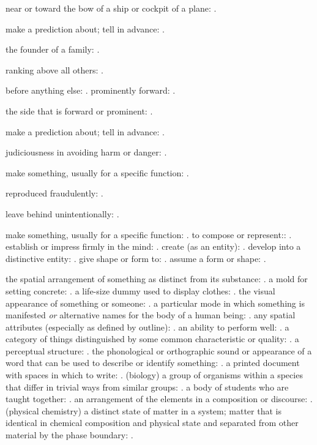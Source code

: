   near or toward the bow of a ship or cockpit of a plane: .

  make a prediction about; tell in advance: .

  the founder of a family: .

  ranking above all others: .

  before anything else: . prominently forward: .

  the side that is forward or prominent: .

  make a prediction about; tell in advance: .

  judiciousness in avoiding harm or danger: .

  make something, usually for a specific function: .

  reproduced fraudulently: .

  leave behind unintentionally: .

  make something, usually for a specific function: . to compose or represent:: . establish or impress firmly in the mind: . create (as an entity): . develop into a distinctive entity: . give shape or form to: . assume a form or shape: .

  the spatial arrangement of something as distinct from its substance: . a mold for setting concrete: . a life-size dummy used to display clothes: . the visual appearance of something or someone: . a particular mode in which something is manifested \textit{or} alternative names for the body of a human being: . any spatial attributes (especially as defined by outline): . an ability to perform well: . a category of things distinguished by some common characteristic or quality: . a perceptual structure: . the phonological or orthographic sound or appearance of a word that can be used to describe or identify something: . a printed document with spaces in which to write: . (biology) a group of organisms within a species that differ in trivial ways from similar groups: . a body of students who are taught together: . an arrangement of the elements in a composition or discourse: . (physical chemistry) a distinct state of matter in a system; matter that is identical in chemical composition and physical state and separated from other material by the phase boundary: .

